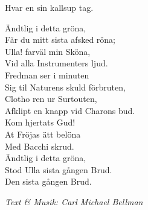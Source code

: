 Hvar en sin kallsup tag.\par
\vspace{10pt}
Ändtlig i detta gröna,\\ 
Får du mitt sista afsked röna;\\ 
Ulla! farväl min Sköna,\\ 
Vid alla Instrumenters ljud.\\ 
Fredman ser i minuten\\ 
Sig til Naturens skuld förbruten,\\ 
Clotho ren ur Surtouten,\\ 
Afklipt en knapp vid Charons bud.\\ 
Kom hjertats Gud!\\ 
At Fröjas ätt belöna\\ 
Med Bacchi skrud.\\ 
Ändtlig i detta gröna,\\ 
Stod Ulla sista gången Brud.\\ 
Den sista gången Brud.\par
\vspace{10pt}
{\footnotesize\textit{Text \& Musik: Carl Michael Bellman}}
